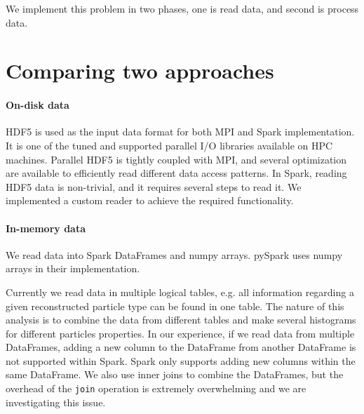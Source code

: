 \documentclass[10pt, twocolumn]{article}
\newcommand{\squeezeup}{\vspace{-5.5mm}}
\begin{document}
We implement this problem in two phases, one is read data, and second is process data. 





\section{Comparing two approaches}
 \paragraph{On-disk data} 
HDF5 is used as the input data format for both MPI and Spark implementation. 
It is one of the tuned and supported parallel I/O libraries available on HPC machines. 
Parallel HDF5 is tightly coupled with MPI, and several optimization are 
available to efficiently read different data access patterns. 
In Spark, reading HDF5 data is non-trivial, and it requires several steps 
to read it. We implemented a custom reader to achieve the required functionality. 

\paragraph{In-memory data}
We read data into Spark DataFrames and numpy arrays. 
pySpark uses numpy arrays in their implementation. 

Currently we read data in multiple logical tables, e.g. all information regarding 
a given reconstructed particle type can be found in one table. The nature of this analysis is to 
combine the data from different tables 
and make several histograms for different particles properties. 
In our experience, if we read data from multiple DataFrames, 
adding a new column to the DataFrame from another 
DataFrame is not supported within Spark. Spark only supports adding new columns within the same DataFrame. 
We also use inner joins to combine the DataFrames, but the overhead of the 
\texttt{join} operation is extremely overwhelming and we are investigating this issue. 
\end{document}
